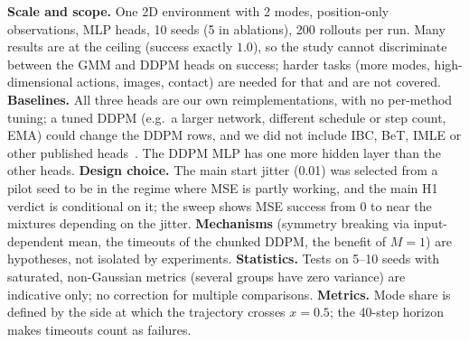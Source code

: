 \textbf{Scale and scope.} One 2D environment with 2 modes, position-only observations, MLP heads, 10 seeds (5 in ablations), 200 rollouts per run. Many results are at the ceiling (success exactly $1.0$), so the study cannot discriminate between the GMM and DDPM heads on success; harder tasks (more modes, high-dimensional actions, images, contact) are needed for that and are not covered. \textbf{Baselines.} All three heads are our own reimplementations, with no per-method tuning; a tuned DDPM (e.g.\ a larger network, different schedule or step count, EMA) could change the DDPM rows, and we did not include IBC, BeT, IMLE or other published heads~\cite{florence2021implicit,shafiullah2022behavior,rana2025imle}. The DDPM MLP has one more hidden layer than the other heads. \textbf{Design choice.} The main start jitter (0.01) was selected from a pilot seed to be in the regime where MSE is partly working, and the main H1 verdict is conditional on it; the sweep shows MSE success from $0$ to near the mixtures depending on the jitter. \textbf{Mechanisms} (symmetry breaking via input-dependent mean, the timeouts of the chunked DDPM, the benefit of $M=1$) are hypotheses, not isolated by experiments. \textbf{Statistics.} Tests on 5--10 seeds with saturated, non-Gaussian metrics (several groups have zero variance) are indicative only; no correction for multiple comparisons. \textbf{Metrics.} Mode share is defined by the side at which the trajectory crosses $x=0.5$; the 40-step horizon makes timeouts count as failures.
